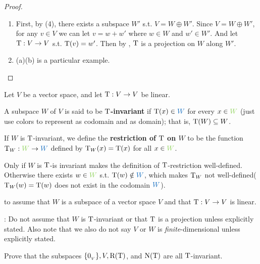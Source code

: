 \begin{proof} \ 
\begin{enumerate}
\item First, by (4), there exists a subspace \(W'\) s.t. \(V = W \oplus W'\).
Since \(V = W \oplus W'\), for any \(v \in V\) we can let \(v = w + w'\) where \(w \in W\) and \(w' \in W'\).
And let \(\mathrm{T} : V \to V\) s.t. \(\mathrm{T}(v) = w'\).
Then by , \(\mathrm{T}\) is a projection on \(W\) along \(W'\).

\item {}(a)(b) is a particular example.
\end{enumerate}
\end{proof}

\begin{additional definition} \label{adef 2.3}
Let \(V\) be a vector space, and let \(\mathrm{T} : V \to V\) be linear.

 A subspace \(W\) of \(V\) is said to be \textbf{\(\mathrm{T}\)-invariant} if \(\T(x) \in \BLUE{W}\) for every \(x \in \GREEN{W}\)
(just use colors to represent \BLUE{\(W\)} as codomain and \GREEN{\(W\)} as domain);
that is, \(\mathrm{T}(W) \subseteq W\).

 If \(W\) is \(\mathrm{T}\)-invariant, we define the \textbf{restriction of \(\mathrm{T}\) on \(W\)} to
be the function \(\T_W : \GREEN{W} \to \BLUE{W}\) defined by \(\mathrm{T}_W(x) = \mathrm{T}(x)\) for all \(x \in \GREEN{W}\).
\end{additional definition}

\begin{note}
Only if \(W\) is \(\mathrm{T}\)-is invariant makes the definition of \(\mathrm{T}\)-restriction well-defined.
Otherwise there exists \(w \in \GREEN{W}\) s.t. \(\T(w) \notin \BLUE{W}\), which makes \(\mathrm{T}_W\) not well-defined(\(\mathrm{T}_W(w) = \mathrm{T}(w)\) does not exist in the codomain \(\BLUE{W}\)).
\end{note}

\begin{note}
 to  assume that \(W\) is a subspace of a vector space \(V\) and that \(\mathrm{T} : V \to V\) is linear.

: Do not assume that \(W\) is \(\mathrm{T}\)-invariant or that \(\mathrm{T}\) is a projection unless explicitly stated.
Also note that we also do not say \(V\) or \(W\) is \emph{finite}-dimensional unless explicitly stated.
\end{note}

\begin{exercise} \label{exercise 2.1.29}
Prove that the subspaces \(\{ 0_{_V} \}, V, \mathrm{R(T)}\), and \(\mathrm{N(T)}\) are all \(\mathrm{T}\)-invariant.
\end{exercise}

